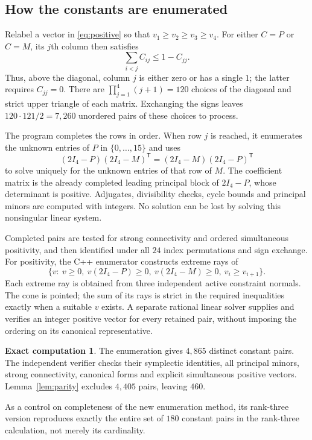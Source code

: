 \documentclass[11pt,a4paper]{article}
\theoremstyle{definition}
\newtheorem{computation}[theorem]{Exact computation}
\begin{document}
\subsection*{How the constants are enumerated}
Relabel a vector in \eqref{eq:positive} so that $v_1\ge v_2\ge v_3\ge v_4$.
For either $C=P$ or $C=M$, its $j$th column then satisfies
\[
 \sum_{i<j}C_{ij}\le 1-C_{jj}.
\]
Thus, above the diagonal, column $j$ is either zero or has a single $1$;
the latter requires $C_{jj}=0$. There are
$\prod_{j=1}^4(j+1)=120$ choices of the diagonal and strict upper triangle
of each matrix. Exchanging the signs leaves $120\cdot121/2=7,260$ unordered
pairs of these choices to process.

The program completes the rows in order. When row $j$ is reached, it
enumerates the unknown entries of $P$ in $\{0,\ldots,15\}$ and uses
\[
 (2I_4-P)(2I_4-M)^{\mathsf T}
 =(2I_4-M)(2I_4-P)^{\mathsf T}
\]
to solve uniquely for the unknown entries of that row of $M$. The coefficient
matrix is the already completed leading principal block of $2I_4-P$,
whose determinant is positive. Adjugates, divisibility checks, cycle bounds
and principal minors are computed with integers. No solution can be lost
by solving this nonsingular linear system.

Completed pairs are tested for strong connectivity and ordered simultaneous
positivity, and then identified under all $24$ index permutations and sign
exchange. For positivity, the C++ enumerator constructs extreme rays of
\[
 \{v:\ v\ge0,\ v(2I_4-P)\ge0,\ v(2I_4-M)\ge0,
             \ v_i\ge v_{i+1}\}.
\]
Each extreme ray is obtained from three independent active constraint
normals. The cone is pointed; the sum of its rays is strict in the required
inequalities exactly when a suitable $v$ exists. A separate rational linear
solver supplies and verifies an integer positive vector for every retained
pair, without imposing the ordering on its canonical representative.

\begin{computation}\label{comp:constants}
The enumeration gives $4,865$ distinct constant pairs. The independent
verifier checks their symplectic identities, all principal minors, strong
connectivity, canonical forms and explicit simultaneous positive vectors.
Lemma~\ref{lem:parity} excludes $4,405$ pairs, leaving $460$.
\end{computation}

As a control on completeness of the new enumeration method, its rank-three
version reproduces exactly the entire set of $180$ constant pairs in the
rank-three calculation, not merely its cardinality.
\end{document}

